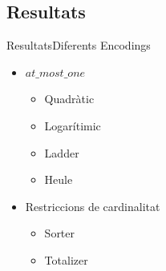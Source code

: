 \documentclass[11pt]{beamer}
\begin{document}
  \subsection{Resultats}

  \begin{frame}{Resultats}{Diferents Encodings}
    \begin{itemize}
      \item $at\_most\_one$
      \begin{itemize}
        \item Quadràtic
        \item Logarítimic
        \item Ladder
        \item Heule
      \end{itemize}
      \item Restriccions de cardinalitat
      \begin{itemize}
        \item Sorter
        \item Totalizer
      \end{itemize}
    \end{itemize}
  \end{frame}
  
\end{document}
